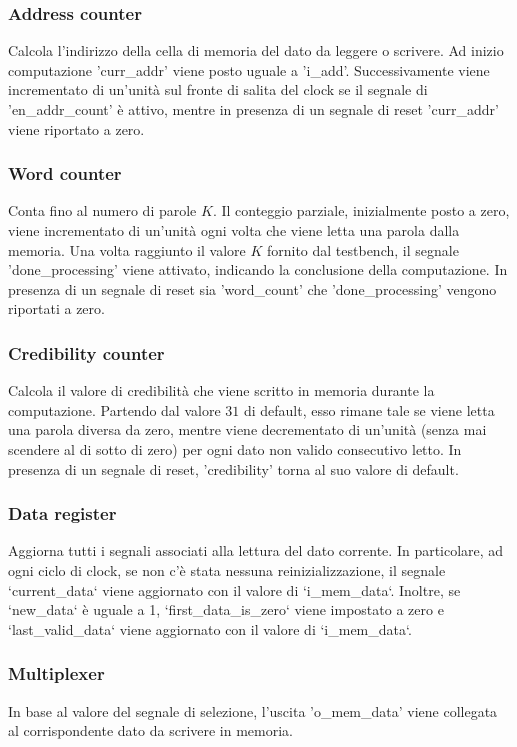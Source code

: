 \subsubsection{Address counter}
 Calcola l'indirizzo della cella di memoria del dato da leggere o scrivere.
 Ad inizio computazione 'curr\_addr' viene posto uguale a 'i\_add'. 
 Successivamente viene incrementato di un'unità sul fronte di salita del clock se il segnale di 'en\_addr\_count' è attivo, mentre in presenza di un segnale di reset 'curr\_addr' viene riportato a zero.
\subsubsection{Word counter}
 Conta fino al numero di parole $K$. 
 Il conteggio parziale, inizialmente posto a zero, viene incrementato di un'unità ogni volta che viene letta una parola dalla memoria. 
 Una volta raggiunto il valore $K$ fornito dal testbench, il segnale 'done\_processing' viene attivato, indicando la conclusione della computazione. 
 In presenza di un segnale di reset sia 'word\_count' che 'done\_processing' vengono riportati a zero.
\subsubsection{Credibility counter}
 Calcola il valore di credibilità che viene scritto in memoria durante la computazione. 
 Partendo dal valore $31$ di default, esso rimane tale se viene letta una parola diversa da zero, mentre viene decrementato di un'unità (senza mai scendere al di sotto di zero) per ogni dato non valido consecutivo letto. 
 In presenza di un segnale di reset, 'credibility' torna al suo valore di default.
\subsubsection{Data register}
Aggiorna tutti i segnali associati alla lettura del dato corrente. 
In particolare, ad ogni ciclo di clock, se non c'è stata nessuna reinizializzazione, il segnale `current\_data` viene aggiornato con il valore di `i\_mem\_data`. 
Inoltre, se `new\_data` è uguale a 1, `first\_data\_is\_zero` viene impostato a zero e `last\_valid\_data` viene aggiornato con il valore di `i\_mem\_data`.
\subsubsection{Multiplexer}
 In base al valore del segnale di selezione, l'uscita 'o\_mem\_data' viene collegata al corrispondente dato da scrivere in memoria. 
